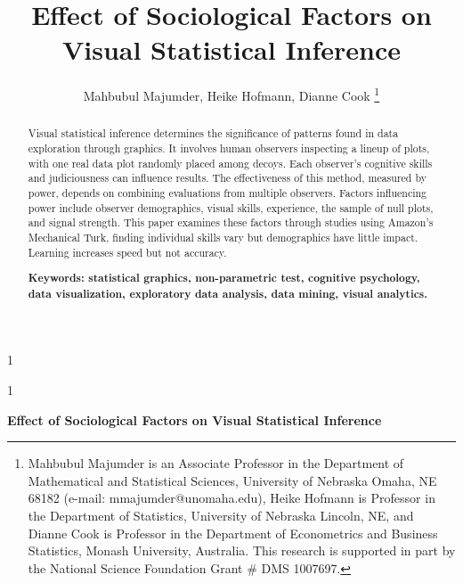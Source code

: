 \documentclass[10pt]{article}\usepackage[]{graphicx}\usepackage[]{xcolor}
\newcommand{\blindDoc}{1}
\begin{document}

\blindDoc
{
  \title{Effect of Sociological Factors on Visual Statistical Inference}
  \author{{Mahbubul Majumder, Heike Hofmann, Dianne Cook}
\thanks{Mahbubul Majumder is an Associate Professor in the Department of Mathematical and Statistical Sciences, University of Nebraska Omaha, NE 68182 (e-mail: mmajumder@unomaha.edu), Heike Hofmann is Professor in the Department of Statistics, University of Nebraska Lincoln, NE, and  Dianne Cook is Professor in the Department of Econometrics and Business Statistics, Monash University, Australia. This research is supported in part by the National Science Foundation Grant \# DMS 1007697.}}
\date{\vspace{-.5in}}
  \maketitle
} \fi

\blindDoc
{
  \bigskip
  \bigskip
  \bigskip
  \begin{center}
    {\bf \LARGE Effect of Sociological Factors on Visual Statistical Inference}
\end{center}
  \medskip
} \fi


\begin {abstract} 

Visual statistical inference determines the significance of patterns found in data exploration through graphics. It involves human observers inspecting a lineup of plots, with one real data plot randomly placed among decoys. Each observer's cognitive skills and judiciousness can influence results. The effectiveness of this method, measured by power, depends on combining evaluations from multiple observers. Factors influencing power include observer demographics, visual skills, experience, the sample of null plots, and signal strength. This paper examines these factors through studies using Amazon's Mechanical Turk, finding individual skills vary but demographics have little impact. Learning increases speed but not accuracy.

{\bf Keywords: \sf statistical graphics, non-parametric test, cognitive psychology, data visualization, exploratory data analysis, data mining, visual analytics.} 
\end {abstract}
\end{document}
